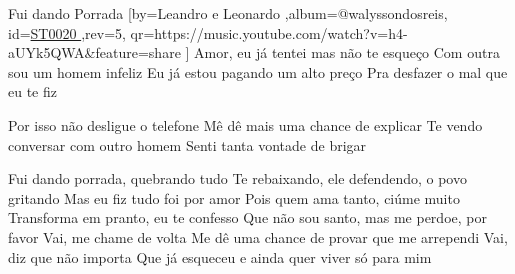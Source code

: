 \beginsong
{Fui dando Porrada %
}[by={Leandro e Leonardo %
},album={@walyssondosreis},
id={\href{https://music.youtube.com/watch?v=h4-aUYk5QWA&feature=share %
}{ST0020 %
}},rev={5}, %
qr={https://music.youtube.com/watch?v=h4-aUYk5QWA&feature=share %
}]
\beginverse 
Amor, eu já tentei mas não te esqueço
Com outra sou um homem infeliz
Eu já estou pagando um alto preço
Pra desfazer o mal que eu te fiz
\endverse

\beginverse 
Por isso não desligue o telefone
Mê dê mais uma chance de explicar
Te vendo conversar com outro homem
Senti tanta vontade de brigar
\endverse

\beginchorus
Fui dando porrada, quebrando tudo
Te rebaixando, ele defendendo, o povo gritando
Mas eu fiz tudo foi por amor
Pois quem ama tanto, ciúme muito
Transforma em pranto, eu te confesso
Que não sou santo, mas me perdoe, por favor
Vai, me chame de volta
Me dê uma chance de provar que me arrependi
Vai, diz que não importa
Que já esqueceu e ainda quer viver só para mim
\endchorus


